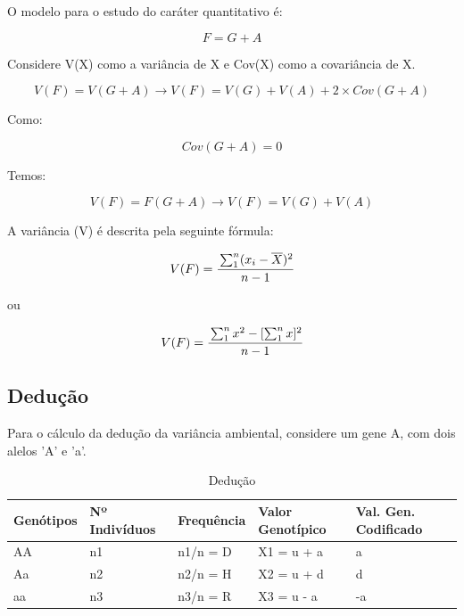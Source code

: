 O modelo para o estudo do caráter quantitativo é:

\begin{equation}
F = G + A
\end{equation}

Considere V(X) como a variância de X e Cov(X) como a covariância de X.

\begin{equation}
V(F) = V(G+A) \rightarrow V(F) = V(G) + V(A) + 2\times Cov(G+A)
\end{equation}

Como:

\begin{equation}
Cov(G+A) = 0
\end{equation}

Temos: 

\begin{equation}
V(F) = F(G+A) \rightarrow V(F) = V(G) + V(A) 
\end{equation}

A variância (V) é descrita pela seguinte fórmula: 

\begin{equation}
V(F) = \cfrac{\sum_{1}^{n} (x_i - \overline{X})^2}{n-1}
\end{equation}

ou

\begin{equation}
V(F) = \cfrac{\sum_{1}^{n} x^2 - [\sum_{1}^{n} x]^2}{n-1}
\end{equation}

\subsection{Dedução}

Para o cálculo da dedução da variância ambiental, considere um gene A, com dois alelos 'A' e 'a'.


\begin{table}[H]
\centering
\begin{tabular}{l l l l l}
\toprule
 \textbf{Genótipos} & \textbf{Nº Indivíduos} & \textbf{Frequência} & \textbf{Valor Genotípico} & \textbf{Val. Gen. Codificado} \\
\midrule
 AA & n1 & n1/n = D & X1 = u + a & a  \\
 Aa & n2 & n2/n = H & X2 = u + d & d  \\
 aa & n3 & n3/n = R & X3 = u - a & -a \\
\bottomrule
\end{tabular}
\caption{Dedução} \label{tab:t05}
\end{table}

